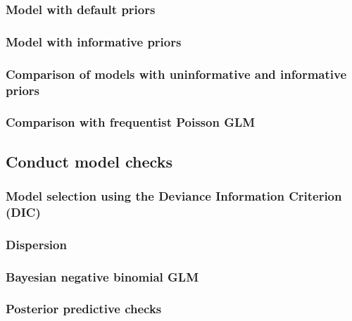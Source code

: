 \documentclass[
]{book}
\begin{document}
\hypertarget{nb-def-priors}{%
\subsubsection{Model with default priors}\label{nb-def-priors}}

\hypertarget{nb-inf-priors}{%
\subsubsection{Model with informative priors}\label{nb-inf-priors}}

\hypertarget{nb-prior-comp}{%
\subsubsection{Comparison of models with uninformative and informative
priors}\label{nb-prior-comp}}

\hypertarget{nb-freq-comp}{%
\subsubsection{Comparison with frequentist Poisson
GLM}\label{nb-freq-comp}}

\hypertarget{conduct-model-checks-2}{%
\subsection{Conduct model checks}\label{conduct-model-checks-2}}

\hypertarget{nb-dic}{%
\subsubsection{Model selection using the Deviance Information Criterion
(DIC)}\label{nb-dic}}

\hypertarget{nb-disp}{%
\subsubsection{Dispersion}\label{nb-disp}}

\hypertarget{nbglm-fit}{%
\subsubsection{Bayesian negative binomial GLM}\label{nbglm-fit}}

\hypertarget{nbglm-ppc}{%
\subsubsection{Posterior predictive checks}\label{nbglm-ppc}}
\end{document}
